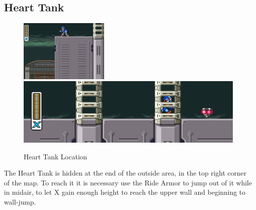\subsection{Heart Tank}
\begin{figure}[htp]
	\centering
	\includegraphics[height=3cm]{figures/X3/Blast_hornet/Heart_1.jpg}\\\vspace{2pt}
	\includegraphics[width=.7\linewidth]{figures/X3/Blast_hornet/Heart_2.jpg}
	\caption{Heart Tank Location}
\end{figure}
The Heart Tank is hidden at the end of the outside area, in the top right corner of the map. To reach it it is necessary use the Ride Armor to jump out of it while in midair, to let X gain enough height to reach the upper wall and beginning to wall-jump.

